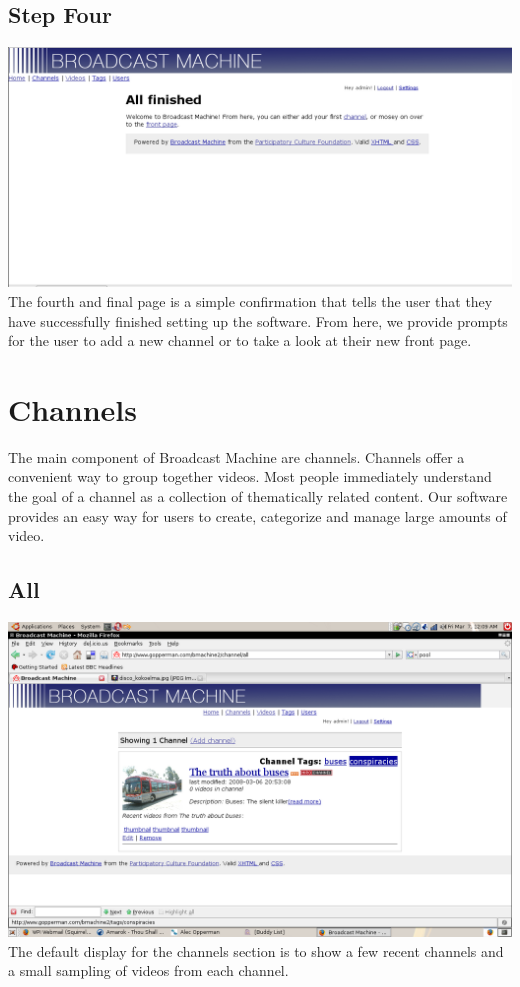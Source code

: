 \documentclass[a4paper,12pt]{report}
\begin{document}
\subsection{Step Four}
\includegraphics{images/setup4.png}
The fourth and final page is a simple confirmation that tells the user that they have successfully finished setting up the software.
From here, we provide prompts for the user to add a new channel or to take a look at their new front page.

\section{Channels}
The main component of Broadcast Machine are channels.
Channels offer a convenient way to group together videos.
Most people immediately understand the goal of a channel as a collection of thematically related content.
Our software provides an easy way for users to create, categorize and manage large amounts of video.

\subsection{All}
\includegraphics{images/channelall.png}
The default display for the channels section is to show a few recent channels and a small sampling of videos from each channel.
\end{document}
